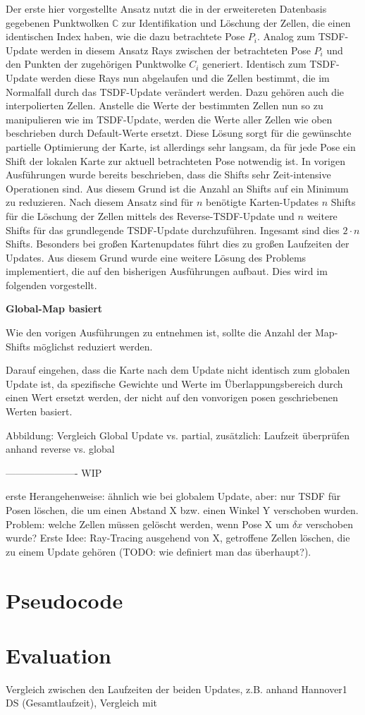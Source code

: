 Der erste hier vorgestellte Ansatz nutzt die in der erweitereten Datenbasis gegebenen Punktwolken $\mathbb{C}$ zur Identifikation und Löschung der Zellen, die einen identischen Index haben, wie die dazu betrachtete Pose $P_i$. Analog zum TSDF-Update werden in diesem Ansatz Rays zwischen der betrachteten Pose $P_i$ und den Punkten der zugehörigen Punktwolke $C_i$ generiert. Identisch zum TSDF-Update werden diese Rays nun abgelaufen und die Zellen bestimmt, die im Normalfall durch das TSDF-Update verändert werden. Dazu gehören auch die interpolierten Zellen. Anstelle die Werte der bestimmten Zellen nun so zu manipulieren wie im TSDF-Update, werden die Werte aller Zellen wie oben beschrieben durch Default-Werte ersetzt. Diese Lösung sorgt für die gewünschte partielle Optimierung der Karte, ist allerdings sehr langsam, da für jede Pose ein Shift der lokalen Karte zur aktuell betrachteten Pose notwendig ist. In vorigen Ausführungen wurde bereits beschrieben, dass die Shifts sehr Zeit-intensive Operationen sind. Aus diesem Grund ist die Anzahl an Shifts auf ein Minimum zu reduzieren. Nach diesem Ansatz sind für $n$ benötigte Karten-Updates $n$ Shifts für die Löschung der Zellen mittels des Reverse-TSDF-Update und $n$ weitere Shifts für das grundlegende TSDF-Update durchzuführen. Ingesamt sind dies $2 \cdot n$ Shifts. Besonders bei großen Kartenupdates führt dies zu großen Laufzeiten der Updates. Aus diesem Grund wurde eine weitere Lösung des Problems implementiert, die auf den bisherigen Ausführungen aufbaut. Dies wird im folgenden vorgestellt.


\textbf{Global-Map basiert}

Wie den vorigen Ausführungen zu entnehmen ist, sollte die Anzahl der Map-Shifts möglichst reduziert werden.




Darauf eingehen, dass die Karte nach dem Update nicht identisch zum globalen Update ist, da spezifische Gewichte und Werte im Überlappungsbereich durch einen Wert ersetzt werden, der nicht auf den vonvorigen posen geschriebenen Werten basiert.

Abbildung: Vergleich Global Update vs. partial, zusätzlich: Laufzeit überprüfen anhand reverse vs. global

----------------------
WIP

erste Herangehenweise: ähnlich wie bei globalem Update, aber: nur TSDF für Posen löschen, die um einen Abstand X bzw. einen Winkel Y verschoben wurden. Problem: welche Zellen müssen gelöscht werden, wenn Pose X um $\delta x$ verschoben wurde? Erste Idee: Ray-Tracing ausgehend von X, getroffene Zellen löschen, die zu einem Update gehören (TODO: wie definiert man das überhaupt?).

\section{Pseudocode}


\section{Evaluation}
\label{section:}

Vergleich zwischen den Laufzeiten der beiden Updates, z.B. anhand Hannover1 DS (Gesamtlaufzeit), Vergleich mit 
